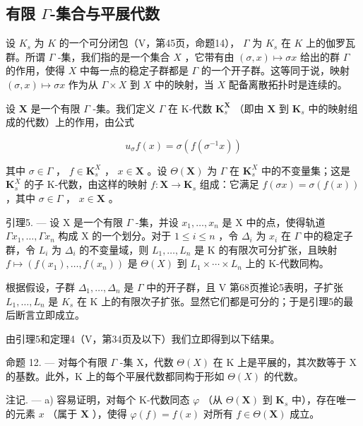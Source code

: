 \subsection{\texorpdfstring{有限 \(\Gamma\)-集合与平展代数}{有限 Gamma-集合与平展代数}}

设 \(K_s\) 为 \(K\) 的一个可分闭包（V，第45页，命题14）， \(\Gamma\) 为 \(K_s\) 在 \(K\) 上的伽罗瓦群。所谓 \(\Gamma\) -集，我们指的是一个集合 \(X\) ，它带有由 \((\sigma, x) \mapsto \sigma x\) 给出的群 \(\Gamma\) 的作用，使得 \(X\) 中每一点的稳定子群都是 \(\Gamma\) 的一个开子群。这等同于说，映射 \((\sigma, x) \mapsto \sigma x\) 作为从 \(\Gamma \times X\) 到 \(X\) 中的映射，当 \(X\) 配备离散拓扑时是连续的。

设 \(\mathbf{X}\) 是一个有限 \(\Gamma\) -集。我们定义 \(\Gamma\) 在 K-代数 \(\mathbf{K}_s^{\mathbf{X}}\) （即由 \(\mathbf{X}\) 到 \(\mathbf{K}_s\) 中的映射组成的代数）上的作用，由公式

\[
u _ {\sigma} f (x) = \sigma \left(f \left(\sigma^ {- 1} x\right)\right)\tag{12}
\]

其中 \(\sigma \in \Gamma\) ， \(f \in \mathbf{K}_s^X\) ， \(x \in \mathbf{X}\) 。设 \(\Theta(\mathbf{X})\) 为 \(\Gamma\) 在 \(\mathbf{K}_s^X\) 中的不变量集；这是 \(\mathbf{K}_s^X\) 的子 K-代数，由这样的映射 \(f: \mathbf{X} \to \mathbf{K}_s\) 组成：它满足 \(f(\sigma x) = \sigma(f(x))\) ，其中 \(\sigma \in \Gamma\) ， \(x \in \mathbf{X}\) 。

引理5. --- 设 X 是一个有限 \(\Gamma\) -集，并设 \(x_1, \ldots, x_n\) 是 X 中的点，使得轨道 \(\Gamma x_1, \ldots, \Gamma x_n\) 构成 X 的一个划分。对于 \(1 \leqslant i \leqslant n\) ，令 \(\Delta_i\) 为 \(x_i\) 在 \(\Gamma\) 中的稳定子群，令 \(L_i\) 为 \(\Delta_i\) 的不变量域，则 \(L_1, \ldots, L_n\) 是 K 的有限次可分扩张，且映射 \(f \mapsto (f(x_1), \ldots, f(x_n))\) 是 \(\Theta(X)\) 到 \(L_1 \times \cdots \times L_n\) 上的 K-代数同构。

根据假设，子群 \(\Delta_{1},\ldots,\Delta_{n}\) 是 \(\Gamma\) 中的开子群，且 V 第68页推论5表明，子扩张 \(L_{1},\ldots,L_{n}\) 是 \(K_{s}\) 在 K 上的有限次子扩张。显然它们都是可分的；于是引理5的最后断言立即成立。

由引理5和定理4（V，第34页及以下）我们立即得到以下结果。

命题 12. --- 对每个有限 \(\Gamma\) -集 X，代数 \(\Theta(X)\) 在 K 上是平展的，其次数等于 X 的基数。此外，K 上的每个平展代数都同构于形如 \(\Theta(X)\) 的代数。

注记. --- a) 容易证明，对每个 K-代数同态 \(\varphi\) （从 \(\Theta(\mathbf{X})\) 到 \(\mathbf{K}_s\) 中），存在唯一的元素 \(x\) （属于 \(\mathbf{X}\) ），使得 \(\varphi(f) = f(x)\) 对所有 \(f \in \Theta(\mathbf{X})\) 成立。

